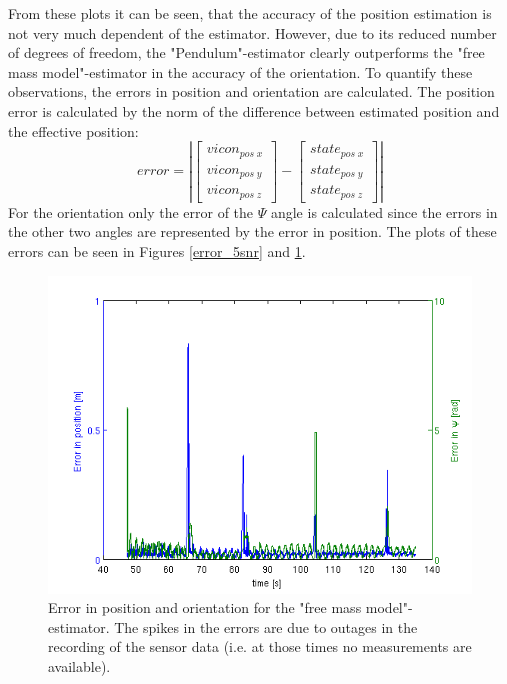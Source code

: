From these plots it can be seen, that the accuracy of the position estimation is not very much dependent of the estimator. However, due to its reduced number of degrees of freedom, the "Pendulum"-estimator clearly outperforms the "free mass model"-estimator in the accuracy of the orientation. 
To quantify these observations, the errors in position and orientation are calculated. The position error is calculated by the norm of the difference between estimated position and the effective position: 
\begin{equation}
error= \left| \begin{bmatrix} vicon_{pos\;x} \\ vicon_{pos\;y} \\ vicon_{pos\;z} \end{bmatrix}-\begin{bmatrix}state_{pos\;x} \\ state_{pos\;y} \\ state_{pos\;z}  \end{bmatrix}\right|
\end{equation}
For the orientation only the error of the $\Psi$ angle is calculated since the errors in the other two angles are represented by the error in position. 
The plots of these errors can be seen in Figures \ref{error_5snr} and \ref{error_5snr_fmm}. 
\begin{figure}[hb]
\centering
\includegraphics[width=1\textwidth]{pictures/2_2_fmm_SNR5_errors_GPS.png}
\caption{Error in position and orientation for the "free mass model"-estimator. The spikes in the errors are due to outages in the recording of the sensor data (i.e. at those times no measurements are available).}
\label{error_5snr_fmm}
\end{figure}
